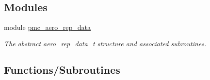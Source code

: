 \subsection*{Modules}
\begin{DoxyCompactItemize}
\item 
module \mbox{\hyperlink{namespacepmc__aero__rep__data}{pmc\+\_\+aero\+\_\+rep\+\_\+data}}
\begin{DoxyCompactList}\small\item\em The abstract \mbox{\hyperlink{structpmc__aero__rep__data_1_1aero__rep__data__t}{aero\+\_\+rep\+\_\+data\+\_\+t}} structure and associated subroutines. \end{DoxyCompactList}\end{DoxyCompactItemize}
\subsection*{Functions/\+Subroutines}
